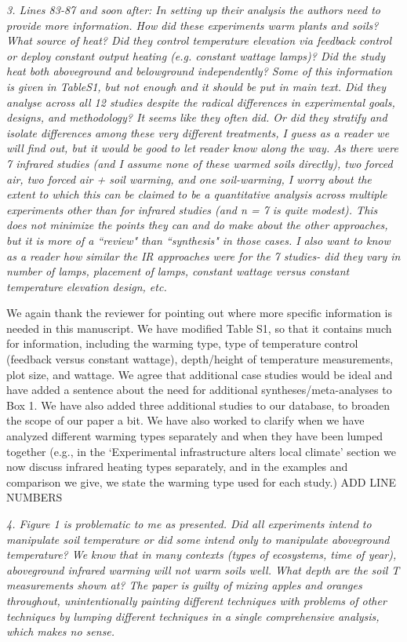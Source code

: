 \documentclass[11pt,a4paper]{letter}
\begin{document}
\begin{letter}{}
\par \emph{3. Lines 83-87 and soon after: In setting up their analysis the authors need to provide more information. How did these experiments warm plants and soils? What source of heat? Did they control temperature elevation via feedback control or deploy constant output heating (e.g. constant wattage lamps)? Did the study heat both aboveground and belowground independently? Some of this information is given in TableS1, but not enough and it should be put in main text. Did they analyse across all 12 studies despite the radical differences in experimental goals, designs, and methodology? It seems like they often did. Or did they stratify and isolate differences among these very different treatments, I guess as a reader we will find out, but it would be good to let reader know along the way. As there were 7 infrared studies (and I assume none of these warmed soils directly), two forced air, two forced air + soil warming, and one soil-warming, I worry about the extent to which this can be claimed to be a quantitative analysis across multiple experiments other than for infrared
studies (and n = 7 is quite modest). This does not minimize the points they can and do make about the other approaches, but it is more of a ``review" than ``synthesis" in those cases. I also want to know as a reader how similar the IR approaches were for the 7 studies- did they vary in number of lamps, placement of lamps, constant wattage versus constant temperature elevation design, etc.}
\par We again thank the reviewer for pointing out where more specific information is needed in this manuscript. We have modified Table S1, so that it contains much for information, including the warming type, type of temperature control (feedback versus constant wattage), depth/height of temperature measurements, plot size, and wattage. We agree that additional case studies would be ideal and have added a sentence about the need for additional syntheses/meta-analyses to Box 1. We have also added three additional studies to our database, to broaden the scope of our paper a bit.  We have also worked to clarify when we have analyzed different warming types separately and when they have been lumped together (e.g., in the `Experimental infrastructure alters local climate' section we now discuss infrared heating types separately, and in the examples and comparison we give, we state the warming type used for each study.)  ADD LINE NUMBERS
\\
\par \emph{4. Figure 1 is problematic to me as presented. Did all experiments intend to manipulate soil temperature or did some intend only to manipulate aboveground temperature? We know that in many contexts (types of ecosystems, time of year), aboveground infrared warming will not warm soils well. What depth are the soil T measurements shown at? The paper is guilty of mixing apples and oranges throughout, unintentionally painting different techniques with problems of other techniques by lumping different techniques in a single comprehensive analysis, which makes no sense.}

\end{letter}
\end{document}
